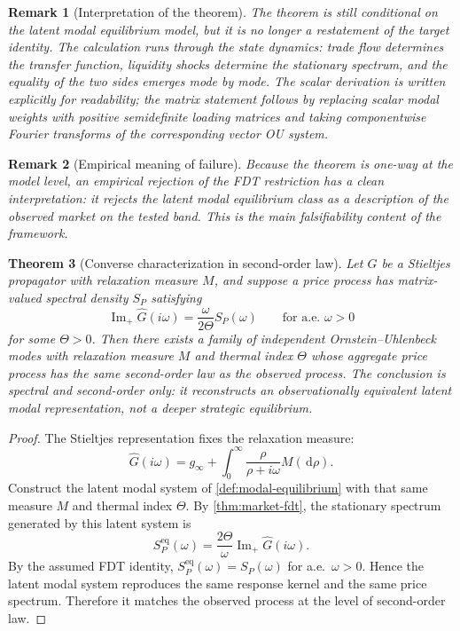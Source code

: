 \documentclass[11pt]{article}
\newtheorem{theorem}{Theorem}[section]
\newtheorem{remark}[theorem]{Remark}
\newcommand{\Ghat}{\widehat{G}}
\newcommand{\ImPart}{\operatorname{Im}_{\!+}}
\newcommand{\dd}{\,\mathrm{d}}
\newcommand{\REV}{}
\begin{document}
\begin{remark}[Interpretation of the theorem]
The theorem is still conditional on the latent modal equilibrium model, but it is no longer a restatement of the target identity. The calculation runs through the state dynamics: trade flow determines the transfer function, liquidity shocks determine the stationary spectrum, and the equality of the two sides emerges mode by mode. The scalar derivation is written explicitly for readability; the matrix statement follows by replacing scalar modal weights with positive semidefinite loading matrices and taking componentwise Fourier transforms of the corresponding vector OU system.
\end{remark}

\begin{remark}[Empirical meaning of failure]
Because the theorem is one-way at the model level, an empirical rejection of the FDT restriction has a clean interpretation: it rejects the latent modal equilibrium class as a description of the observed market on the tested band. This is the main falsifiability content of the framework.
\end{remark}

\begin{theorem}[Converse characterization in second-order law]\label{thm:converse}\REV
Let $G$ be a Stieltjes propagator with relaxation measure $M$, and suppose a price process has matrix-valued spectral density $S_P$ satisfying
\[
  \ImPart \Ghat(i\omega)=\frac{\omega}{2\Theta}S_P(\omega)
  \qquad \text{for a.e.\ }\omega>0
\]
for some $\Theta>0$. Then there exists a family of independent Ornstein--Uhlenbeck modes with relaxation measure $M$ and thermal index $\Theta$ whose aggregate price process has the same second-order law as the observed process. The conclusion is spectral and second-order only: it reconstructs an observationally equivalent latent modal representation, not a deeper strategic equilibrium.
\end{theorem}

\begin{proof}
The Stieltjes representation fixes the relaxation measure:
\[
  \Ghat(i\omega)=g_\infty+\int_0^\infty \frac{\rho}{\rho+i\omega}M(\dd\rho).
\]
Construct the latent modal system of \cref{def:modal-equilibrium} with that same measure $M$ and thermal index $\Theta$. By \cref{thm:market-fdt}, the stationary spectrum generated by this latent system is
\[
  S_P^{\mathrm{eq}}(\omega)=\frac{2\Theta}{\omega}\ImPart \Ghat(i\omega).
\]
By the assumed FDT identity, $S_P^{\mathrm{eq}}(\omega)=S_P(\omega)$ for a.e.\ $\omega>0$. Hence the latent modal system reproduces the same response kernel and the same price spectrum. Therefore it matches the observed process at the level of second-order law.
\end{proof}
\end{document}
